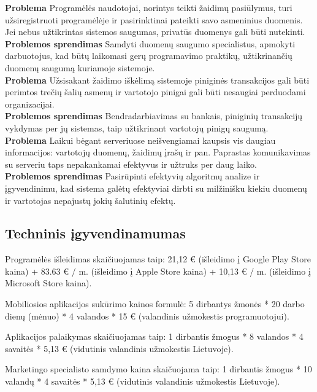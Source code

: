 \documentclass{VUMIFPSkursinis}
\begin{document}
		\noindent \textbf{Problema} Programėlės naudotojai, norintys teikti žaidimų pasiūlymus, turi užsiregistruoti programėlėje ir pasirinktinai pateikti savo asmeninius duomenis. Jei nebus užtikrintas sistemos saugumas, privatūs duomenys gali būti nutekinti.\\
		\noindent \textbf{Problemos sprendimas} Samdyti duomenų saugumo specialistus, apmokyti darbuotojus, kad būtų laikomasi gerų programavimo praktikų, užtikrinančių duomenų saugumą kuriamoje sistemoje. \\
		
		\noindent \textbf{Problema} Užsisakant žaidimo iškėlimą sistemoje piniginės transakcijos gali būti perimtos trečių šalių asmenų ir vartotojo pinigai gali būti nesaugiai perduodami organizacijai.\\
		\noindent \textbf{Problemos sprendimas} Bendradarbiavimas su bankais, piniginių transakcijų vykdymas per jų sistemas, taip užtikrinant vartotojų pinigų saugumą. \\
		
		\noindent \textbf{Problema} Laikui bėgant serveriuose neišvengiamai kaupsis vis daugiau informacijos: vartotojų duomenų, žaidimų įrašų ir pan. Paprastas komunikavimas su serveriu taps nepakankamai efektyvus ir užtruks per daug laiko.\\
		\noindent \textbf{Problemos sprendimas} Pasirūpinti efektyvių algoritmų analize ir įgyvendinimu, kad sistema galėtų efektyviai dirbti su milžinišku kiekiu duomenų ir vartotojas nepajustų jokių šalutinių efektų. \\
		
	\subsection{Techninis įgyvendinamumas}	
		Programėlės išleidimas skaičiuojamas taip: 21,12 € (išleidimo į Google 
		Play Store kaina) + 83.63 € / m. (išleidimo į Apple Store kaina)  + 10,13 
		€ / m. (išleidimo į Microsoft Store kaina).
		
		Mobiliosios aplikacijos sukūrimo kainos formulė: 5 dirbantys žmonės * 20 
		darbo dienų (mėnuo) * 4 valandos * 15 € (valandinis užmokestis 
		programuotojui).

		Aplikacijos palaikymas skaičiuojamas taip: 1 dirbantis žmogus * 8 valandos * 4 
		savaitės * 5,13 € (vidutinis valandinis užmokestis Lietuvoje).

		Marketingo specialisto samdymo kaina skaičuojama taip: 1 dirbantis žmogus * 
		10 valandų * 4 savaitės * 5,13 € (vidutinis valandinis užmokestis Lietuvoje).
\end{document}
